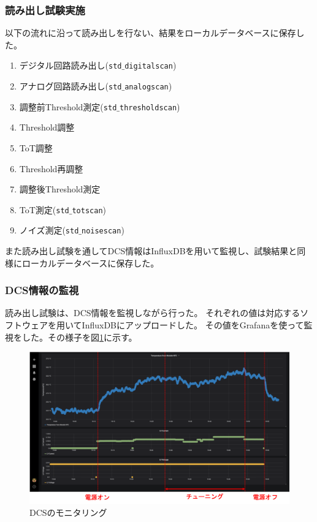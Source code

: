 \subsubsection{読み出し試験実施}
以下の流れに沿って読み出しを行ない、結果をローカルデータベースに保存した。
\begin{enumerate}
  \item デジタル回路読み出し(\texttt{std$\_$digitalscan})
  \item アナログ回路読み出し(\texttt{std$\_$analogscan})
  \item 調整前Threshold測定(\texttt{std$\_$thresholdscan})
  \item Threshold調整
  \item ToT調整
  \item Threshold再調整
  \item 調整後Threshold測定
  \item ToT測定(\texttt{std$\_$totscan})
  \item ノイズ測定(\texttt{std$\_$noisescan})
\end{enumerate}

また読み出し試験を通してDCS情報はInfluxDBを用いて監視し、試験結果と同様にローカルデータベースに保存した。

\subsubsection{DCS情報の監視}
読み出し試験は、DCS情報を監視しながら行った。
それぞれの値は対応するソフトウェアを用いてInfluxDBにアップロードした。
その値をGrafanaを使って監視をした。その様子を図\ref{demo_monitor_dcs}に示す。

\begin{figure}[bpt]\centering
\includegraphics[width=12cm]{demo_monitor_dcs}
\caption[DCSのモニタリング]{DCSのモニタリング}
\label{demo_monitor_dcs}
\end{figure}

